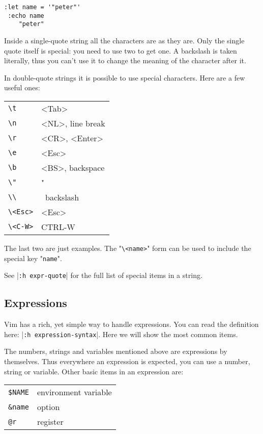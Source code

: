 \begin{Verbatim}[samepage=true]
 :let name = '"peter"'
 :echo name
    "peter"
\end{Verbatim}

Inside a single-quote string all the characters are as they are.
Only the single quote itself is special: you need to use two to get one.
A backslash is taken literally, thus you can't use it to change the meaning of the character after it.

In double-quote strings it is possible to use special characters.
Here are a few useful ones:

\begin{center} \begin{tabular}{l l}
				\verb!\t! & <Tab> \\
				\verb!\n! & <NL>, line break \\
				\verb!\r! & <CR>, <Enter> \\
				\verb!\e! & <Esc> \\
				\verb!\b! & <BS>, backspace \\
				\verb!\"! & " \\
				\verb!\\! & \, backslash \\
				\verb!\<Esc>! & <Esc> \\
				\verb!\<C-W>! & CTRL-W \\
\end{tabular} \end{center}

The last two are just examples.
The  "\verb!\<name>!" form can be used to include the special key "\verb!name!".

See |\verb!:h expr-quote!| for the full list of special items in a string.
\subsection{Expressions}
Vim has a rich, yet simple way to handle expressions.
You can read the definition here: |\verb!:h expression-syntax!|.
Here we will show the most common items.

The numbers, strings and variables mentioned above are expressions by themselves.
Thus everywhere an expression is expected, you can use a number, string or variable.
Other basic items in an expression are:

\begin{center} \begin{tabular}{l l}
				\verb!$NAME! & environment variable \\
				\verb!&name! & option \\
				\verb!@r! & register \\
\end{tabular} \end{center}

